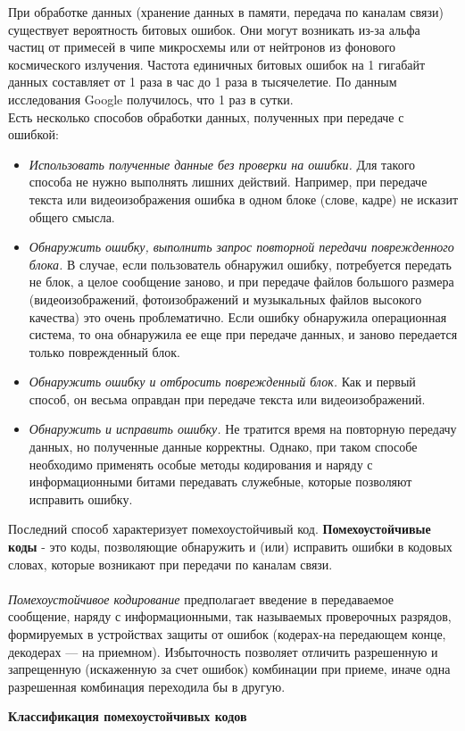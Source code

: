 При обработке данных (хранение данных в памяти, передача по каналам связи) существует вероятность битовых ошибок. Они могут возникать из-за альфа частиц от примесей в чипе микросхемы или от нейтронов из фонового космического излучения. Частота единичных битовых ошибок на 1 гигабайт данных составляет от 1 раза в час до 1 раза в тысячелетие. По данным исследования Google получилось, что 1 раз в сутки.
\\Есть несколько способов обработки данных, полученных при передаче с ошибкой:
\begin{itemize}
  \item \emph{Использовать полученные данные без проверки на ошибки.} Для такого способа не нужно выполнять лишних действий. Например, при передаче текста или видеоизображения ошибка в одном блоке (слове, кадре) не исказит общего смысла.
  \item \emph{Обнаружить ошибку, выполнить запрос повторной передачи поврежденного блока.} В случае, если пользователь обнаружил ошибку, потребуется передать не блок, а целое сообщение заново, и при передаче файлов большого размера (видеоизображений, фотоизображений и музыкальных файлов высокого качества) это очень проблематично. Если ошибку обнаружила операционная система, то она обнаружила ее еще при передаче данных, и заново передается только поврежденный блок.
  \item \emph{Обнаружить ошибку и отбросить поврежденный блок.} Как и первый способ, он весьма оправдан при передаче текста или видеоизображений.
  \item \emph{Обнаружить и исправить ошибку.} Не тратится время на повторную передачу данных, но полученные данные корректны. Однако, при таком способе необходимо применять особые методы кодирования и наряду с информационными битами передавать служебные, которые позволяют исправить ошибку.
\end{itemize}
Последний способ характеризует помехоустойчивый код.
\textbf{Помехоустойчивые коды} - это коды, позволяющие обнаружить и (или) исправить ошибки в кодовых словах, которые возникают при передачи по каналам связи.\\
\\\emph{Помехоустойчивое кодирование} предполагает введение в передаваемое сообщение, наряду с информационными, так называемых проверочных разрядов, формируемых в устройствах защиты от ошибок (кодерах-на передающем конце, декодерах — на приемном). Избыточность позволяет отличить разрешенную и запрещенную (искаженную за счет ошибок) комбинации при приеме, иначе одна разрешенная комбинация переходила бы в другую.
\begin{center}
  \textbf{Классификация помехоустойчивых кодов}
\end{center}

